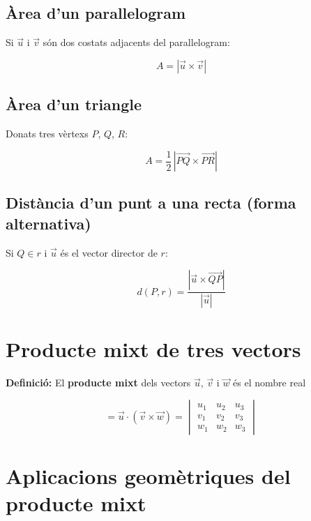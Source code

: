 \subsection{Àrea d'un paral\textperiodcentered{}lelogram}

Si $\vec u$ i $\vec v$ són dos costats adjacents del paral\textperiodcentered{}lelogram:

\begin{equation*}
A = |\vec u\times\vec v|
\end{equation*}

\subsection{Àrea d'un triangle}

Donats tres vèrtexs $P$, $Q$, $R$:

\begin{equation*}
A = \frac12\,|\overrightarrow{PQ}\times\overrightarrow{PR}|
\end{equation*}

\subsection{Distància d'un punt a una recta (forma alternativa)}

Si $Q \in r$ i $\vec u$ és el vector director de $r$:

\begin{equation*}
d(P, r) = \frac{|\vec u\times\overrightarrow{QP}|}{|\vec u|}
\end{equation*}

\section{Producte mixt de tres vectors}

\textbf{Definició:} El \textbf{producte mixt} dels vectors $\vec u$, $\vec v$ i $\vec w$ és el nombre real

\begin{equation}
[\vec u, \vec v, \vec w] = \vec u\cdot(\vec v\times\vec w) = \begin{vmatrix} u_1 & u_2 & u_3 \\ v_1 & v_2 & v_3 \\ w_1 & w_2 & w_3 \end{vmatrix}
\end{equation}

\section{Aplicacions geomètriques del producte mixt}

